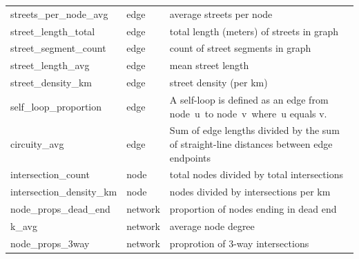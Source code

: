 \documentclass[
  10pt,
]{article}
\begin{document}
\begin{longtable}{l|l|p{8cm}}
\bottomrule
\endlastfoot
  streets\_per\_node\_avg &     edge &                                                                                                                average streets per node \\
    street\_length\_total &     edge &                                                                                               total length (meters) of streets in graph \\
   street\_segment\_count &     edge &                                                                                                       count of street segments in graph \\
      street\_length\_avg &     edge &                                                                                                                      mean street length \\
      street\_density\_km &     edge &                                                                                                                 street density (per km) \\
   self\_loop\_proportion &     edge &                                                               A self-loop is defined as an edge from node u to node v where u equals v. \\
            circuity\_avg &     edge &                                                Sum of edge lengths divided by the sum of straight-line distances between edge endpoints \\
      intersection\_count &     node &                                                                                              total nodes divided by total intersections \\
intersection\_density\_km &     node &                                                                                                   nodes divided by intersections per km \\
   node\_props\_dead\_end &  network &                                                                                                  proportion of nodes ending in dead end \\
                   k\_avg &  network &                                                                                                                     average node degree \\
        node\_props\_3way &  network &                                                                                                       proprotion of 3-way intersections \\

\end{longtable}
\end{document}
